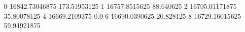 0 16842.73046875 173.51953125
1 16757.8515625 88.640625
2 16705.01171875 35.80078125
4 16669.2109375 0.0
6 16690.0390625 20.828125
8 16729.16015625 59.94921875
